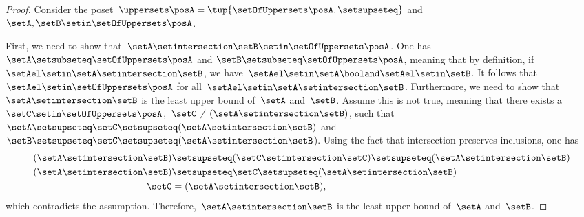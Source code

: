 \begin{proof}
    Consider the poset~$\uppersets \posA=\tup{\setOfUppersets \posA,\setsupseteq}$ and~$\setA,\setB\setin \setOfUppersets \posA$.

    First, we need to show that~$\setA\setintersection \setB\setin \setOfUppersets \posA$.
    One has~$\setA \setsubseteq \setOfUppersets \posA$ and $\setB\setsubseteq \setOfUppersets \posA$, meaning that by definition, if~$\setAel\setin \setA\setintersection \setB$, we have~$\setAel \setin \setA \booland \setAel \setin \setB$.
    It follows that~$\setAel \setin \setOfUppersets \posA$ for all~$\setAel \setin \setA\setintersection \setB$.
    Furthermore, we need to show that~$\setA\setintersection \setB$ is the least upper bound of~$\setA$ and~$\setB$.
    Assume this is not true, meaning that there exists a~$\setC\setin \setOfUppersets \posA$,~$\setC\neq (\setA\setintersection \setB)$, such that~$\setA\setsupseteq \setC\setsupseteq (\setA\setintersection \setB)$ and~$\setB\setsupseteq \setC\setsupseteq (\setA\setintersection \setB$).
        Using the fact that intersection preserves inclusions, one has
        \begin{equation}
            \begin{aligned}
                (\setA\setintersection \setB)
                                              & \setsupseteq (\setC\setintersection \setC) \setsupseteq (\setA\setintersection \setB ) \\
                (\setA\setintersection \setB) & \setsupseteq \setC \setsupseteq (\setA\setintersection \setB ) \\
                \setC                         & = (\setA\setintersection \setB),
            \end{aligned}
        \end{equation}
        which contradicts the assumption.
        Therefore,~$\setA\setintersection \setB$ is the least upper bound of~$\setA$ and~$\setB$.


\end{proof}
